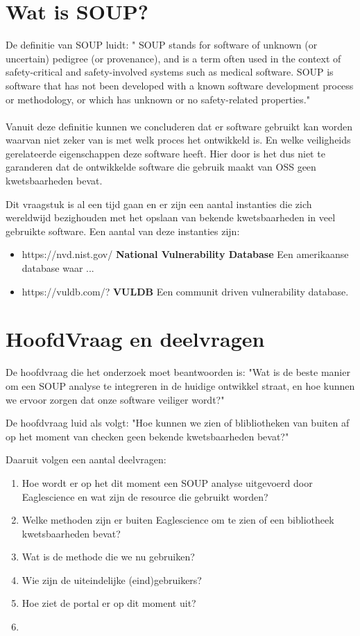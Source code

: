 \section{Wat is SOUP?}
De definitie van SOUP luidt: "  SOUP stands for software of unknown (or uncertain) pedigree (or provenance), and is a term often used in the context of safety-critical and safety-involved systems such as medical software. SOUP is software that has not been developed with a known software development process or methodology, or which has unknown or no safety-related properties." \\ 
\\
Vanuit deze definitie kunnen we concluderen dat er software gebruikt kan worden waarvan niet zeker van is met welk proces het ontwikkeld is. En welke veiligheids gerelateerde eigenschappen deze software heeft. Hier door is het dus niet te garanderen dat de ontwikkelde software die gebruik maakt van OSS geen kwetsbaarheden bevat.

Dit vraagstuk is al een tijd gaan en er zijn een aantal instanties die zich wereldwijd bezighouden met het opslaan van bekende kwetsbaarheden in veel gebruikte software. Een aantal van deze instanties zijn:
\begin{itemize}
\item{https://nvd.nist.gov/  \textbf{National Vulnerability Database} Een amerikaanse database waar ... }
\item{https://vuldb.com/? \textbf{VULDB} Een communit driven vulnerability database. }
\end{itemize} 




\section{HoofdVraag en deelvragen}

De hoofdvraag die het onderzoek moet beantwoorden is: "Wat is de beste manier om een SOUP analyse te integreren in de huidige ontwikkel straat, en hoe kunnen we ervoor zorgen dat onze software veiliger wordt?" 


De hoofdvraag luid als volgt: "Hoe kunnen we zien of blibliotheken van buiten af op het moment van checken geen bekende kwetsbaarheden bevat?" 

Daaruit volgen een aantal deelvragen:
\begin{enumerate}
\item Hoe wordt er op het dit moment een SOUP analyse uitgevoerd door Eaglescience en wat zijn de resource die gebruikt worden?
\item Welke methoden zijn er buiten Eaglescience om te zien of een bibliotheek kwetsbaarheden bevat?
\item Wat is de methode die we nu gebruiken?
\item Wie zijn de uiteindelijke (eind)gebruikers? 
\item Hoe ziet de portal er op dit moment uit? 
\item 
\end{enumerate}

